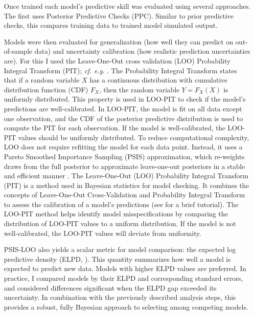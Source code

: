 \documentclass[preprint,authoryear]{elsarticle}
\begin{document}
Once trained each model's predictive skill was evaluated using several approaches. The first uses Posterior Predictive Checks (PPC). Similar to prior predictive checks, this compares training data to trained model simulated output. 

Models were then evaluated for generalization (how well they can predict on out-of-sample data) and uncertainty calibration (how realistic prediction uncertainties are). For this I used the Leave-One-Out cross validation (LOO) Probability Integral Transform (PIT); \textit{cf. e.g.} \cite{nguyen2025}. The Probability Integral Transform states that if a random variable $X$ has a continuous distribution with cumulative distribution function (CDF) $F_X$, then the random variable $Y = F_X(X)$ is uniformly distributed. This property is used in LOO-PIT to check if the model's predictions are well-calibrated. In LOO-PIT, the model is fit on all data except one observation, and the CDF of the posterior predictive distribution is used to compute the PIT for each observation. If the model is well-calibrated, the LOO-PIT values should be uniformly distributed. To reduce computational complexity, LOO does not require refitting the model for each data point. Instead, it uses a Pareto Smoothed Importance Sampling (PSIS) approximation, which re-weights draws from the full posterior to approximate leave-one-out posteriors in a stable and efficient manner \citep{vehtari2017}.
The Leave-One-Out (LOO) Probability Integral Transform (PIT) is a method used in Bayesian statistics for model checking. It combines the concepts of Leave-One-Out Cross-Validation and Probability Integral Transform to assess the calibration of a model's predictions (see \citealt{karakoylublog} for a brief tutorial). The LOO-PIT method helps identify model misspecifications by comparing the distribution of LOO-PIT values to a uniform distribution. If the model is not well-calibrated, the LOO-PIT values will deviate from uniformity.

PSIS-LOO also yields a scalar metric for model comparison: the expected log predictive density (ELPD, \citealt{vehtari2017}). This quantity summarizes how well a model is expected to predict new data. Models with higher ELPD values are preferred. In practice, I compared models by their ELPD and corresponding standard errors, and considered differences significant when the ELPD gap exceeded its uncertainty. In combination with the previously described analysis steps, this provides a robust, fully Bayesian approach to selecting among competing models.
\end{document}
